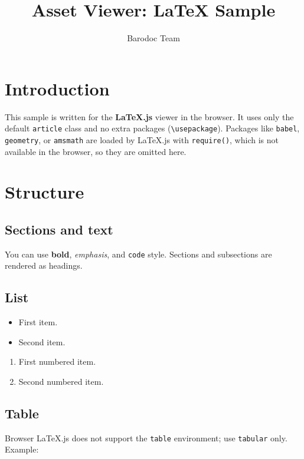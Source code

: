 \documentclass{article}
\begin{document}
\title{Asset Viewer: LaTeX Sample}
\author{Barodoc Team}
\maketitle

\section{Introduction}

This sample is written for the \textbf{LaTeX.js} viewer in the browser. It uses only the default \texttt{article} class and no extra packages (\verb|\usepackage|). Packages like \texttt{babel}, \texttt{geometry}, or \texttt{amsmath} are loaded by LaTeX.js with \texttt{require()}, which is not available in the browser, so they are omitted here.

\section{Structure}

\subsection{Sections and text}

You can use \textbf{bold}, \emph{emphasis}, and \texttt{code} style. Sections and subsections are rendered as headings.

\subsection{List}

\begin{itemize}
  \item First item.
  \item Second item.
\end{itemize}

\begin{enumerate}
  \item First numbered item.
  \item Second numbered item.
\end{enumerate}

\subsection{Table}

Browser LaTeX.js does not support the \texttt{table} environment; use \texttt{tabular} only. Example:
\end{document}
